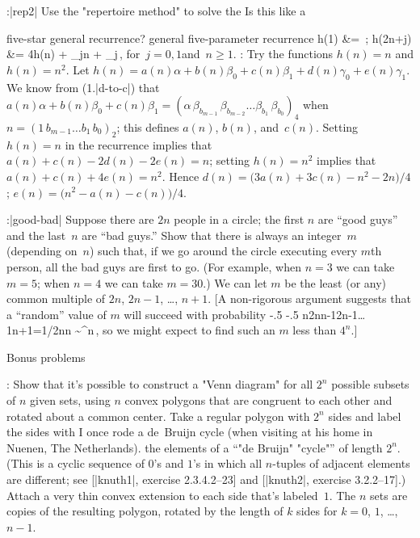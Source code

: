 \ex:\exref|rep2|%
Use the "repertoire method" to solve the
\g Is this like a\par five-star general recurrence?\g
 general five-parameter recurrence
\begindisplay
h(1)	&= \alpha \,; \cr
h(2n+j)	&= 4h(n) + \gamma_jn + \beta_j\,,
			\qquad\hbox{for $j=0,1$\quad and \quad $n \geq 1$.}
\enddisplay
\Hint: Try the functions $h(n)=n$ and $h(n)=n^2$.
\answer Let $h(n)=a(n)\alpha+b(n)\beta_0+c(n)\beta_1+d(n)\gamma_0+e(n)\gamma_1$.
We know from \equ(1.|d-to-c|) that $a(n)\alpha+b(n)\beta_0+c(n)\beta_1=
  (\alpha\, \beta_{b_{m-1}}\, \beta_{b_{m-2}}
\ldots \beta_{b_1}\, \beta_{b_0})_4$ when
$n=(1\, b_{m-1} \ldots b_1\, b_0)_2$; this defines $a(n)$, $b(n)$, and~$c(n)$.
Setting $h(n)=n$ in the recurrence implies that $a(n)+c(n)-2d(n)-2e(n)=n$;
setting $h(n)=n^2$ implies that $a(n)+c(n)+4e(n)=n^2$. Hence
$d(n)=\bigl(3a(n)+3c(n)-n^2-2n\bigr)/4$; $e(n)=\bigl(n^2-a(n)-c(n)\bigr)/4$.

\ex:\exref|good-bad|%
Suppose there are $2n$ people in a circle; the first $n$ are ``good guys''
and the last~$n$ are ``bad guys.\qback'' Show that there is
always an integer~$m$
(depending on~$n$) such that, if we go around the circle executing every
$m$th person, all the bad guys are first to go. (For example, when $n=3$
we can take $m=5$; when $n=4$ we can take $m=30$.)
\answer We can let $m$ be the least (or any) common multiple of
$2n$, $2n-1$, \dots, $n+1$. [A non-rigorous argument suggests that
a ``random'' value of $m$ will succeed with probability
\begindisplay\advance\abovedisplayskip-.5\baselineskip%
             \advance\belowdisplayskip-.5\baselineskip
{n\over2n}{n-1\over2n-1}\ldots{1\over n+1}=1\bigg/{2n\choose n}
\sim{^n}\,,
\enddisplay
so we might expect to find such an $m$ less than $4^n$.]

\subhead Bonus problems

\ex:
Show that it's possible to construct a "Venn diagram" for all $2^n$
possible subsets of $n$ given sets, using $n$ convex polygons that
are congruent to each other and rotated about a common center.
\answer Take a regular polygon with $2^n$ sides and label the sides with
\g I once rode a de~Bruijn cycle (when visiting at his home in
Nuenen, The Netherlands).\g
the elements of a ``"de Bruijn" "cycle"'' of length $2^n$. (This is a cyclic
sequence of $0$'s and $1$'s in which all $n$-tuples of adjacent elements
are different; see [|knuth1|, exercise 2.3.4.2--23] and [|knuth2|,
exercise 3.2.2--17].) Attach a very thin convex extension to each side
that's labeled~$1$. The $n$ sets are copies of the resulting polygon,
rotated by the length of $k$ sides for $k=0$, $1$, \dots,~$n-1$.

